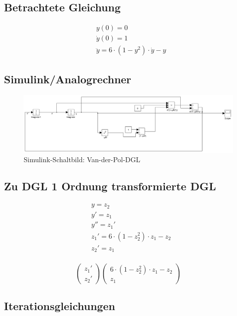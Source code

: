 \documentclass[10pt]{scrartcl}
\begin{document}
	\subsection{Betrachtete Gleichung}
		\begin{align}
		&y(0) = 0\\
		&\dot{y}(0) = 1\\
		&\ddot{y} = 6 \cdot (1-y^2) \cdot \dot{y} -y
		\end{align}

	\subsection{Simulink/Analogrechner}
	\begin{figure}[htbp]
	\centering
		\includegraphics[scale=0.4]{aufg2_a_simulink}
	\caption{Simulink-Schaltbild: Van-der-Pol-DGL}
	\label{fig:simulinkAufg2}
	\end{figure}	
	
	\subsection{Zu DGL 1 Ordnung transformierte DGL}
		\begin{align}
		&y=z_2\\
		&y'=z_1\\
		&y''=z_1'\\
		&z_1' = 6 \cdot (1-z_2^2) \cdot z_1 - z_2\\
		&z_2' = z_1\\
		\end{align}
		
		\[
		\begin{pmatrix}
  			z_1' \\
 			z_2'
 		\end{pmatrix}	
		\begin{pmatrix}
  			6 \cdot (1-z_2^2) \cdot z_1 - z_2\\
 			z_1
 		\end{pmatrix}	 		
		\]

	\subsection{Iterationsgleichungen}
\end{document}
